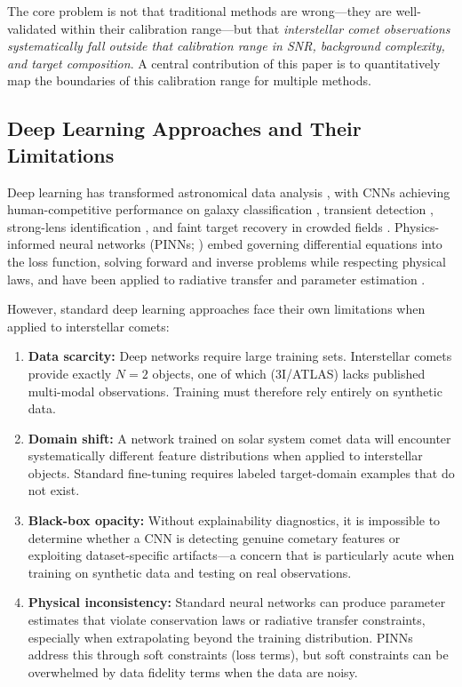 \documentclass[preprint2]{aastex631}
\begin{document}
The core problem is not that traditional methods are wrong---they are well-validated within their calibration range---but that \textit{interstellar comet observations systematically fall outside that calibration range in SNR, background complexity, and target composition}. A central contribution of this paper is to quantitatively map the boundaries of this calibration range for multiple methods.

\subsection{Deep Learning Approaches and Their Limitations}

Deep learning has transformed astronomical data analysis \citep{baron19}, with CNNs achieving human-competitive performance on galaxy classification \citep{dieleman15}, transient detection \citep{goldstein15}, strong-lens identification \citep{lanusse18}, and faint target recovery in crowded fields \citep{jiang23}. Physics-informed neural networks (PINNs; \citealt{raissi19}) embed governing differential equations into the loss function, solving forward and inverse problems while respecting physical laws, and have been applied to radiative transfer \citep{mishra21,biswal25} and parameter estimation \citep{lu21}.

However, standard deep learning approaches face their own limitations when applied to interstellar comets:

\begin{enumerate}
    \item \textbf{Data scarcity:} Deep networks require large training sets. Interstellar comets provide exactly $N=2$ objects, one of which (3I/ATLAS) lacks published multi-modal observations. Training must therefore rely entirely on synthetic data.
    \item \textbf{Domain shift:} A network trained on solar system comet data will encounter systematically different feature distributions when applied to interstellar objects. Standard fine-tuning requires labeled target-domain examples that do not exist.
    \item \textbf{Black-box opacity:} Without explainability diagnostics, it is impossible to determine whether a CNN is detecting genuine cometary features or exploiting dataset-specific artifacts---a concern that is particularly acute when training on synthetic data and testing on real observations.
    \item \textbf{Physical inconsistency:} Standard neural networks can produce parameter estimates that violate conservation laws or radiative transfer constraints, especially when extrapolating beyond the training distribution. PINNs address this through soft constraints (loss terms), but soft constraints can be overwhelmed by data fidelity terms when the data are noisy.
\end{enumerate}
\end{document}
